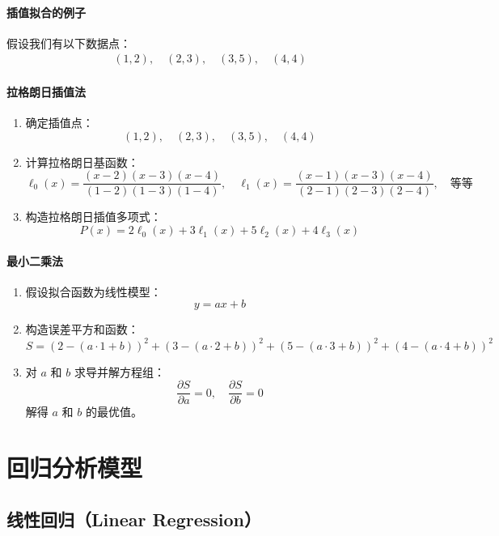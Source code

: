 \documentclass[UTF8]{ctexart}
\begin{document}
\paragraph{插值拟合的例子}
假设我们有以下数据点：
\[
\begin{aligned}
(1, 2), \quad (2, 3), \quad (3, 5), \quad (4, 4)
\end{aligned}
\]
\paragraph{拉格朗日插值法}
\begin{enumerate}
    \item 确定插值点：
    \[
    (1, 2), \quad (2, 3), \quad (3, 5), \quad (4, 4)
    \]
    \item 计算拉格朗日基函数：
    \[
    \ell_0(x) = \frac{(x-2)(x-3)(x-4)}{(1-2)(1-3)(1-4)}, \quad \ell_1(x) = \frac{(x-1)(x-3)(x-4)}{(2-1)(2-3)(2-4)}, \quad \text{等等}
    \]
    \item 构造拉格朗日插值多项式：
    \[
    P(x) = 2\ell_0(x) + 3\ell_1(x) + 5\ell_2(x) + 4\ell_3(x)
    \]
\end{enumerate}

\paragraph{最小二乘法}
\begin{enumerate}
    \item 假设拟合函数为线性模型：
    \[
    y = ax + b
    \]
    \item 构造误差平方和函数：
    \[
    S = (2 - (a \cdot 1 + b))^2 + (3 - (a \cdot 2 + b))^2 + (5 - (a \cdot 3 + b))^2 + (4 - (a \cdot 4 + b))^2
    \]
    \item 对 \(a\) 和 \(b\) 求导并解方程组：
    \[
    \frac{\partial S}{\partial a} = 0, \quad \frac{\partial S}{\partial b} = 0
    \]
    解得 \( a \) 和 \( b \) 的最优值。
\end{enumerate}

\newpage

\section {回归分析模型}
\subsection {线性回归（Linear Regression）}
\end{document}
